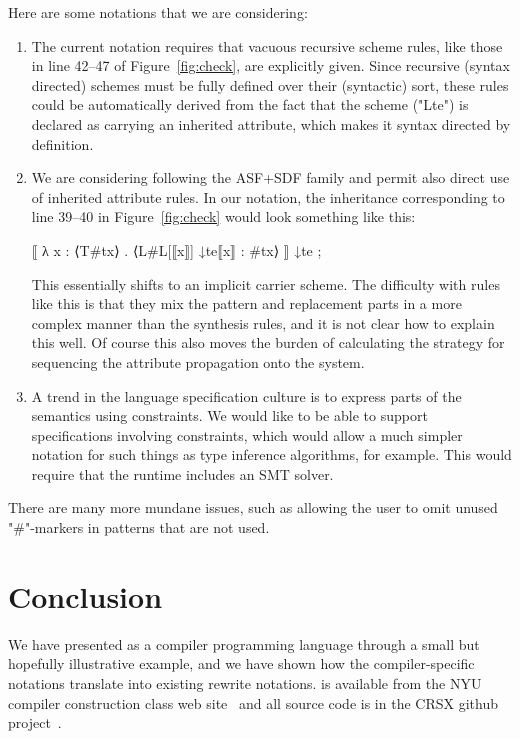 \documentclass[letterpaper]{article}
\begin{document}
Here are some notations that we are considering:
\begin{enumerate}[resume]

\item The current notation requires that vacuous recursive scheme rules, like those in line 42--47
  of Figure~\ref{fig:check}, are explicitly given. Since recursive (syntax directed) schemes must be
  fully defined over their (syntactic) sort, these rules could be automatically derived from the
  fact that the scheme ("Lte") is declared as carrying an inherited attribute, which makes it syntax
  directed by definition.

\item We are considering following the ASF+SDF family and permit also direct use of inherited
  attribute rules. In our notation, the inheritance corresponding to line 39--40 in
  Figure~\ref{fig:check} would look something like this:
  \begin{hacs}
      ⟦ λ x : ⟨T#tx⟩ . ⟨L#L[⟦x⟧]  ↓te{⟦x⟧ : #tx}⟩ ⟧   ↓te ;
  \end{hacs}
  This essentially shifts to an implicit carrier scheme. The difficulty with rules like this is that
  they mix the pattern and replacement parts in a more complex manner than the synthesis rules, and
  it is not clear how to explain this well. Of course this also moves the burden of calculating the
  strategy for sequencing the attribute propagation onto the system.

\item A trend in the language specification culture is to express parts of the semantics using
  constraints. We would like \HAX to be able to support specifications involving constraints, which
  would allow a much simpler notation for such things as type inference algorithms, for
  example. This would require that the runtime includes an SMT solver.

\end{enumerate}
There are many more mundane issues, such as allowing the user to omit unused "#"-markers in patterns
that are not used.


\section{Conclusion}
\label{sec:conc}

We have presented \HAX as a compiler programming language through a small but hopefully illustrative
example, and we have shown how the compiler-specific notations translate into existing rewrite
notations. \HAX is available from the NYU compiler construction class web
site~\cite{RoseRose:cims2015} and all source code is in the CRSX github project~\cite{crsx}.
\end{document}
